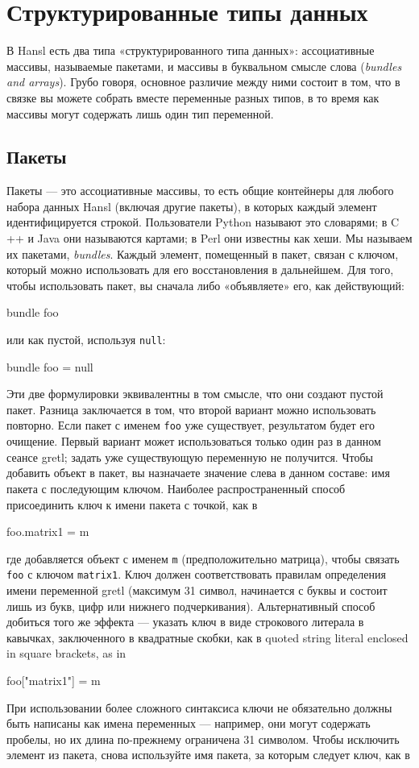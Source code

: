 \chapter{Структурированные типы данных}
\label{chap:structypes}

В Hansl есть два типа «структурированного типа данных»: ассоциативные
массивы, называемые пакетами, и массивы в буквальном смысле слова
(\emph{bundles and arrays}). Грубо говоря, основное различие между
ними состоит в том, что в связке вы можете собрать вместе переменные
разных типов, в то время как массивы могут содержать лишь один тип
переменной.

\section{Пакеты}
\label{sec:bundles}

Пакеты --- это ассоциативные массивы, то есть общие контейнеры для
любого набора данных Hansl (включая другие пакеты), в которых каждый
элемент идентифицируется строкой. Пользователи Python называют это
словарями; в C ++ и Java они называются картами; в Perl они известны
как хеши. Мы называем их пакетами, \emph{bundles}. Каждый элемент,
помещенный в пакет, связан с ключом, который можно использовать для
его восстановления в дальнейшем.  Для того, чтобы использовать пакет,
вы сначала либо «объявляете» его, как действующий:
%
\begin{code}
bundle foo
\end{code}
%
или как пустой, используя \texttt{null}:
%
\begin{code}
bundle foo = null
\end{code}
%
Эти две формулировки эквивалентны в том смысле, что они создают пустой
пакет. Разница заключается в том, что второй вариант можно
использовать повторно. Если пакет с именем \texttt{foo} уже
существует, результатом будет его очищение. Первый вариант может
использоваться только один раз в данном сеансе gretl; задать уже
существующую переменную не получится.  Чтобы добавить объект в пакет,
вы назначаете значение слева в данном составе: имя пакета с
последующим ключом. Наиболее распространенный способ присоединить ключ
к имени пакета с точкой, как в
\begin{code}
  foo.matrix1 = m
\end{code}
где добавляется объект с именем \texttt{m} (предположительно матрица),
чтобы связать \texttt{foo} с ключом \texttt{matrix1}. Ключ должен
соответствовать правилам определения имени переменной gretl (максимум
31 символ, начинается с буквы и состоит лишь из букв, цифр или нижнего
подчеркивания).  Альтернативный способ добиться того же эффекта ---
указать ключ в виде строкового литерала в кавычках, заключенного в
квадратные скобки, как в quoted string literal enclosed in square
brackets, as in
\begin{code}
  foo["matrix1"] = m
\end{code}
При использовании более сложного синтаксиса ключи не обязательно
должны быть написаны как имена переменных --- например, они могут
содержать пробелы, но их длина по-прежнему ограничена 31 символом.
Чтобы исключить элемент из пакета, снова используйте имя пакета, за
которым следует ключ, как в

